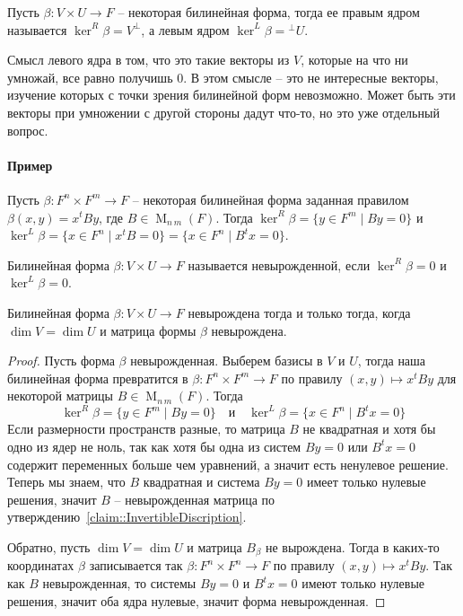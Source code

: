 \begin{definition}
Пусть $\beta\colon V\times U\to F$ -- некоторая билинейная форма, тогда ее правым ядром называется $\ker^R \beta =V^\bot$, а левым ядром $\ker^L\beta = {}^\bot U$.
\end{definition}

Смысл левого ядра в том, что это такие векторы из $V$, которые на что ни умножай, все равно получишь $0$. В этом смысле -- это не интересные векторы, изучение которых с точки зрения билинейной форм невозможно. Может быть эти векторы при умножении с другой стороны дадут что-то, но это уже отдельный вопрос.

\paragraph{Пример}
Пусть $\beta\colon F^n\times F^m \to F$ -- некоторая билинейная форма заданная правилом $\beta(x,y) = x^t By$, где $B\in \operatorname{M}_{n\,m}(F)$. Тогда
$\ker^R \beta = \{y\in F^m\mid By = 0\}$ и $\ker^L\beta = \{x\in F^n \mid x^t B = 0\} = \{x\in F^n \mid B^t x = 0\}$.

\begin{definition}
Билинейная форма $\beta\colon V\times U\to F$ называется невырожденной, если $\ker^R\beta = 0$ и $\ker^L\beta = 0$.
\end{definition}


\begin{claim}
Билинейная форма $\beta\colon V\times U\to F$ невырождена тогда и только тогда, когда $\dim V = \dim U$ и матрица формы $\beta$ невырождена.
\end{claim}
\begin{proof}
Пусть форма $\beta$ невырожденная. Выберем базисы в $V$ и $U$, тогда наша билинейная форма превратится в $\beta\colon F^n \times F^m\to F$ по правилу $(x,y)\mapsto x^t B y$ для некоторой матрицы $B\in \operatorname{M}_{n\,m}(F)$. Тогда
\[
\ker^R \beta = \{y\in F^m\mid By = 0\}\quad\text{и}\quad \ker^L\beta = \{x\in F^n \mid B^t x = 0\}
\]
Если размерности пространств разные, то матрица $B$ не квадратная и хотя бы одно из ядер не ноль, так как хотя бы одна из систем $B y = 0$ или $B^t x = 0$ содержит переменных больше чем уравнений, а значит есть ненулевое решение. Теперь мы знаем, что $B$ квадратная и система $By = 0$ имеет только нулевые решения, значит $B$ -- невырожденная матрица по утверждению~\ref{claim::InvertibleDiscription}.

Обратно, пусть $\dim V = \dim U$ и матрица $B_\beta$ не вырождена. Тогда в каких-то координатах $\beta$ записывается так $\beta\colon F^n \times F^n \to F$ по правилу $(x,y)\mapsto x^t By$. Так как $B$ невырожденная, то системы $B y = 0$ и $B^t x = 0$ имеют только нулевые решения, значит оба ядра нулевые, значит форма невырожденная.

\end{proof}

